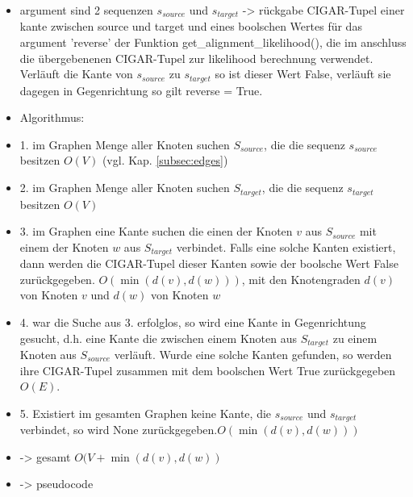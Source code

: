 \begin{itemize}
	\item argument sind 2 sequenzen $ s_{source} $ und $ s_{target} $ -> rückgabe CIGAR-Tupel einer kante zwischen source und target und eines boolschen Wertes für das argument 'reverse' der Funktion get\_alignment\_likelihood(), die im anschluss die übergebenenen CIGAR-Tupel zur likelihood berechnung verwendet. Verläuft die Kante von $ s_{source} $ zu $ s_{target} $ so ist dieser Wert False, verläuft sie dagegen in Gegenrichtung so gilt reverse = True. \\
    \item Algorithmus:
	\item 1. im Graphen Menge aller Knoten suchen $ S_{source} $, die die sequenz $ s_{source} $ besitzen $O(V)$ (vgl. Kap. \ref{subsec:edges}) \\
	\item 2. im Graphen Menge aller Knoten suchen $ S_{target} $, die die sequenz $ s_{target} $ besitzen $ O(V) $\\
	\item 3. im Graphen eine Kante suchen die einen der Knoten $v$ aus $ S_{source} $ mit einem der Knoten $w$ aus $ S_{target} $ verbindet. Falls eine solche Kanten existiert, dann werden die CIGAR-Tupel dieser Kanten sowie der boolsche Wert False zurückgegeben. $O(\min (d(v), d(w)))$, mit den Knotengraden $d(v) $von Knoten $v$ und $d(w) $ von Knoten $w$ ~\cite{docs_graph_tool}\\
	\item 4. war die Suche aus 3. erfolglos, so wird eine Kante in Gegenrichtung gesucht, d.h. eine Kante die zwischen einem Knoten aus $ S_{target} $ zu einem Knoten aus $ S_{source} $ verläuft. Wurde eine solche Kanten gefunden, so werden ihre CIGAR-Tupel zusammen mit dem boolschen Wert True zurückgegeben $O(E)$.\\
	\item 5. Existiert im gesamten Graphen keine Kante, die  $ s_{source} $ und $ s_{target} $ verbindet, so wird None zurückgegeben.$O(\min (d(v), d(w)))$\\
	\item -> gesamt $ O(V+\min (d(v), d(w))$	\\
	\item -> pseudocode\\


\end{itemize}
